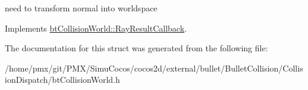 need to transform normal into worldspace 

Implements \hyperlink{structbtCollisionWorld_1_1RayResultCallback}{bt\+Collision\+World\+::\+Ray\+Result\+Callback}.



The documentation for this struct was generated from the following file\+:\begin{DoxyCompactItemize}
\item 
/home/pmx/git/\+P\+M\+X/\+Simu\+Cocos/cocos2d/external/bullet/\+Bullet\+Collision/\+Collision\+Dispatch/bt\+Collision\+World.\+h\end{DoxyCompactItemize}
